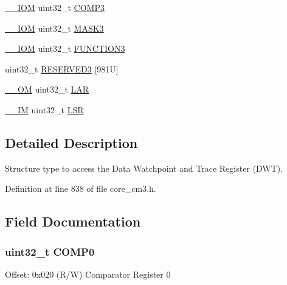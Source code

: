 \begin{DoxyCompactItemize}
\hyperlink{core__sc300_8h_ab6caba5853a60a17e8e04499b52bf691}{\+\_\+\+\_\+\+I\+OM} uint32\+\_\+t \hyperlink{struct_d_w_t___type_a20b0b62a3576ee88db4a7c065cd988ac}{C\+O\+M\+P3}
\item 
\hyperlink{core__sc300_8h_ab6caba5853a60a17e8e04499b52bf691}{\+\_\+\+\_\+\+I\+OM} uint32\+\_\+t \hyperlink{struct_d_w_t___type_a51e9ef8e2238e82f3b40aa2599397637}{M\+A\+S\+K3}
\item 
\hyperlink{core__sc300_8h_ab6caba5853a60a17e8e04499b52bf691}{\+\_\+\+\_\+\+I\+OM} uint32\+\_\+t \hyperlink{struct_d_w_t___type_afbfaba1d10558329868c6c55f91f82df}{F\+U\+N\+C\+T\+I\+O\+N3}
\item 
uint32\+\_\+t \hyperlink{struct_d_w_t___type_a50825e7e6f5677bb8276fb8cf3191f7f}{R\+E\+S\+E\+R\+V\+E\+D3} \mbox{[}981\+U\mbox{]}
\item 
\hyperlink{core__sc300_8h_a0ea2009ed8fd9ef35b48708280fdb758}{\+\_\+\+\_\+\+OM} uint32\+\_\+t \hyperlink{struct_d_w_t___type_acc9e51f871c357a9094105435b150d13}{L\+AR}
\item 
\hyperlink{core__sc300_8h_a4cc1649793116d7c2d8afce7a4ffce43}{\+\_\+\+\_\+\+IM} uint32\+\_\+t \hyperlink{struct_d_w_t___type_a7219432d03f6cd1d220f4fe10aef4880}{L\+SR}
\end{DoxyCompactItemize}


\subsection{Detailed Description}
Structure type to access the Data Watchpoint and Trace Register (D\+WT). 

Definition at line 838 of file core\+\_\+cm3.\+h.



\subsection{Field Documentation}
\subsubsection[{\texorpdfstring{C\+O\+M\+P0}{COMP0}}]{ uint32\+\_\+t C\+O\+M\+P0}\hypertarget{struct_d_w_t___type_a5d0c69187f8abc99ecbde49431cf0050}{}\label{struct_d_w_t___type_a5d0c69187f8abc99ecbde49431cf0050}
Offset\+: 0x020 (R/W) Comparator Register 0 

